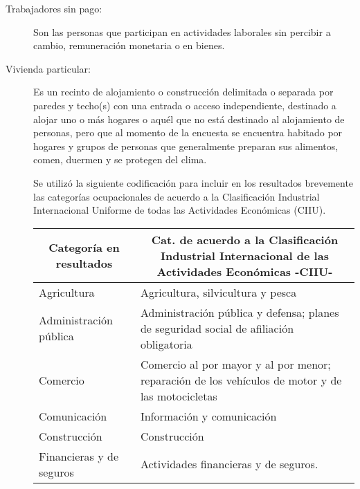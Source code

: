 \begin{description}
	\item[Trabajadores sin pago:] Son las personas que participan en actividades laborales sin percibir a cambio, remuneración monetaria o en bienes.
	\item[Vivienda particular:] Es un recinto de alojamiento o construcción delimitada o separada por paredes y techo(s) con una entrada o acceso independiente, destinado a alojar uno o más hogares o aquél que no está destinado al alojamiento de personas, pero que al momento de la encuesta se encuentra habitado por hogares y grupos de personas que generalmente preparan sus alimentos, comen, duermen y se protegen del clima.
	
\newpage
Se utilizó la siguiente codificación para incluir en los resultados brevemente las categorías ocupacionales de acuerdo a la Clasificación Industrial Internacional Uniforme de todas las Actividades Económicas (CIIU).
\begin{table}[ht]
\begin{tabular}{|l|l|}
\hline
\multicolumn{1}{|c|}{\textbf{Categoría en resultados}} & \multicolumn{1}{c|}{\textbf{ Cat. de acuerdo a la Clasificación Industrial Internacional de las Actividades Económicas -CIIU-}}                                        \\ \hline
Agricultura                                            & Agricultura, silvicultura y pesca                                                                \\ \hline
Administración pública                                 & Administración pública y defensa; planes de seguridad social de afiliación obligatoria           \\ \hline
Comercio                                               & Comercio al por mayor y al por menor; reparación de los vehículos de motor y de las motocicletas \\ \hline
Comunicación                                           & Información y comunicación                                                                       \\ \hline
Construcción                                           & Construcción                                                                                     \\ \hline
Financieras y de seguros                               & Actividades financieras y de seguros.                                                            \\ \hline

\end{tabular}
\end{table}
\end{description}
